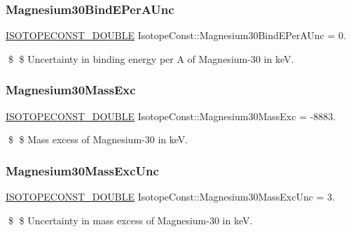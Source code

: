\subsubsection{\texorpdfstring{Magnesium30\+Bind\+E\+Per\+A\+Unc}{Magnesium30BindEPerAUnc}}
{\footnotesize\ttfamily \mbox{\hyperlink{group___isotope_const-_macros_ga8f45a7272ce02c0b4c65c44636ed719a}{I\+S\+O\+T\+O\+P\+E\+C\+O\+N\+S\+T\+\_\+\+D\+O\+U\+B\+LE}} Isotope\+Const\+::\+Magnesium30\+Bind\+E\+Per\+A\+Unc = 0.}

\$ \$ Uncertainty in binding energy per A of Magnesium-\/30 in keV. \mbox{\label{group___isotope_const-_magnesium-_mg30_gad72d77554cb8829bb114ed812bd0c622}} 
\subsubsection{\texorpdfstring{Magnesium30\+Mass\+Exc}{Magnesium30MassExc}}
{\footnotesize\ttfamily \mbox{\hyperlink{group___isotope_const-_macros_ga8f45a7272ce02c0b4c65c44636ed719a}{I\+S\+O\+T\+O\+P\+E\+C\+O\+N\+S\+T\+\_\+\+D\+O\+U\+B\+LE}} Isotope\+Const\+::\+Magnesium30\+Mass\+Exc = -\/8883.}

\$ \$ Mass excess of Magnesium-\/30 in keV. \mbox{\label{group___isotope_const-_magnesium-_mg30_gafbfaaaad42754694a94114f4b08306d4}} 
\subsubsection{\texorpdfstring{Magnesium30\+Mass\+Exc\+Unc}{Magnesium30MassExcUnc}}
{\footnotesize\ttfamily \mbox{\hyperlink{group___isotope_const-_macros_ga8f45a7272ce02c0b4c65c44636ed719a}{I\+S\+O\+T\+O\+P\+E\+C\+O\+N\+S\+T\+\_\+\+D\+O\+U\+B\+LE}} Isotope\+Const\+::\+Magnesium30\+Mass\+Exc\+Unc = 3.}

\$ \$ Uncertainty in mass excess of Magnesium-\/30 in keV. \mbox{\label{group___isotope_const-_magnesium-_mg30_gaa249dd7a4f13c0e3c47f921e2ca0599b}} 
